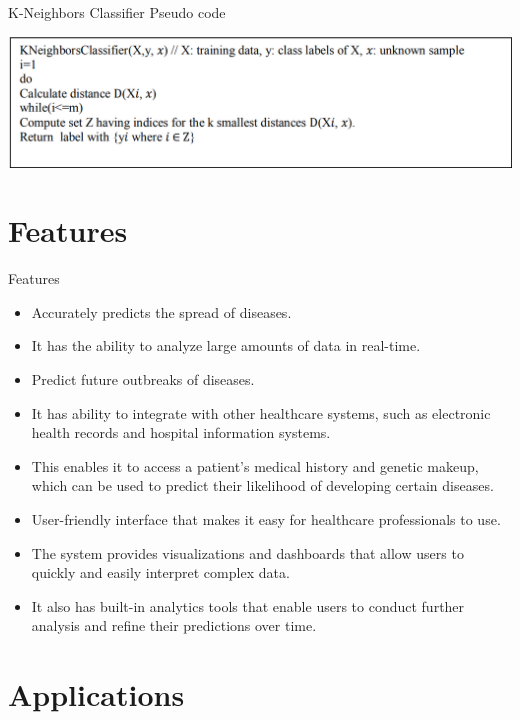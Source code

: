 \documentclass{SKP-beamer}
\begin{document}
\begin{frame}{K-Neighbors Classifier Pseudo code}
	\begin{center}
		\includegraphics[scale=0.48]{2.png}
	\end{center}
\end{frame}

\section{\textbf{Features}}

\begin{frame}{Features}
	\begin{itemize}
		\item Accurately predicts the spread of diseases. 
		\item It has the ability to analyze large amounts of data in real-time. 
		\item Predict future outbreaks of diseases. 
		\item It has ability to integrate with other healthcare systems, such as electronic health records and hospital information systems. 
		\item This enables it to access a patient's medical history and genetic makeup, which can be used to predict their likelihood of developing certain diseases.
		\item User-friendly interface that makes it easy for healthcare professionals to use. 
		\item The system provides visualizations and dashboards that allow users to quickly and easily interpret complex data. 
		\item It also has built-in analytics tools that enable users to conduct further analysis and refine their predictions over time.
		
	\end{itemize}
\end{frame}

\section{\textbf{Applications}}
\end{document}

